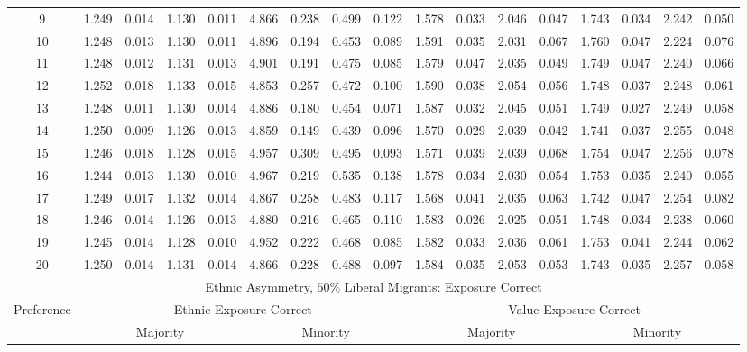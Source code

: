 \documentclass{article}
\begin{document}
\begin{table}[H]
{\begin{tabular}{|c|c|c|c|c|c|c|c|c|c|c|c|c|c|c|c|c|}
     9 & 1.249 & 0.014 & 1.130 & 0.011 & 4.866 & 0.238 & 0.499 & 0.122 & 1.578 & 0.033 & 2.046 & 0.047 & 1.743 & 0.034 & 2.242 & 0.050 \\ 
    10 & 1.248 & 0.013 & 1.130 & 0.011 & 4.896 & 0.194 & 0.453 & 0.089 & 1.591 & 0.035 & 2.031 & 0.067 & 1.760 & 0.047 & 2.224 & 0.076 \\ 
    11 & 1.248 & 0.012 & 1.131 & 0.013 & 4.901 & 0.191 & 0.475 & 0.085 & 1.579 & 0.047 & 2.035 & 0.049 & 1.749 & 0.047 & 2.240 & 0.066 \\ 
    12 & 1.252 & 0.018 & 1.133 & 0.015 & 4.853 & 0.257 & 0.472 & 0.100 & 1.590 & 0.038 & 2.054 & 0.056 & 1.748 & 0.037 & 2.248 & 0.061 \\ 
    13 & 1.248 & 0.011 & 1.130 & 0.014 & 4.886 & 0.180 & 0.454 & 0.071 & 1.587 & 0.032 & 2.045 & 0.051 & 1.749 & 0.027 & 2.249 & 0.058 \\ 
    14 & 1.250 & 0.009 & 1.126 & 0.013 & 4.859 & 0.149 & 0.439 & 0.096 & 1.570 & 0.029 & 2.039 & 0.042 & 1.741 & 0.037 & 2.255 & 0.048 \\ 
    15 & 1.246 & 0.018 & 1.128 & 0.015 & 4.957 & 0.309 & 0.495 & 0.093 & 1.571 & 0.039 & 2.039 & 0.068 & 1.754 & 0.047 & 2.256 & 0.078 \\ 
    16 & 1.244 & 0.013 & 1.130 & 0.010 & 4.967 & 0.219 & 0.535 & 0.138 & 1.578 & 0.034 & 2.030 & 0.054 & 1.753 & 0.035 & 2.240 & 0.055 \\ 
    17 & 1.249 & 0.017 & 1.132 & 0.014 & 4.867 & 0.258 & 0.483 & 0.117 & 1.568 & 0.041 & 2.035 & 0.063 & 1.742 & 0.047 & 2.254 & 0.082 \\ 
    18 & 1.246 & 0.014 & 1.126 & 0.013 & 4.880 & 0.216 & 0.465 & 0.110 & 1.583 & 0.026 & 2.025 & 0.051 & 1.748 & 0.034 & 2.238 & 0.060 \\ 
    19 & 1.245 & 0.014 & 1.128 & 0.010 & 4.952 & 0.222 & 0.468 & 0.085 & 1.582 & 0.033 & 2.036 & 0.061 & 1.753 & 0.041 & 2.244 & 0.062 \\ 
    20 & 1.250 & 0.014 & 1.131 & 0.014 & 4.866 & 0.228 & 0.488 & 0.097 & 1.584 & 0.035 & 2.053 & 0.053 & 1.743 & 0.035 & 2.257 & 0.058 \\ 
  \hline
  \multicolumn{17}{|c|}{Ethnic Asymmetry, $50 \%$ Liberal Migrants: Exposure Correct}  \\\hline
 Preference &  \multicolumn{8}{|c|}{Ethnic Exposure Correct} & \multicolumn{8}{|c|}{Value Exposure Correct}   \\\hline
 & \multicolumn{4}{|c|}{Majority} & \multicolumn{4}{|c|}{Minority}  & \multicolumn{4}{|c|}{Majority} & \multicolumn{4}{|c|}{Minority}  \\

\end{tabular}}
\end{table}
\end{document}
